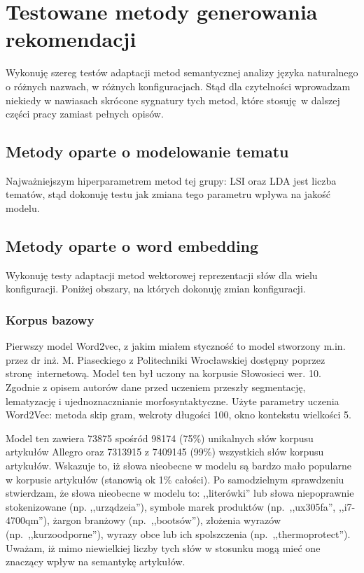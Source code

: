 \documentclass[pl]{minipw} %
\begin{document}
\section{Testowane metody generowania rekomendacji}

Wykonuję szereg testów adaptacji metod semantycznej analizy języka naturalnego o różnych nazwach, w różnych konfiguracjach. Stąd dla czytelności wprowadzam niekiedy w nawiasach skrócone sygnatury tych metod, które stosuję w dalszej części pracy zamiast pełnych opisów.

\subsection{Metody oparte o modelowanie tematu}

Najważniejszym hiperparametrem metod tej grupy: LSI oraz LDA jest liczba tematów, stąd dokonuję testu jak zmiana tego parametru wpływa na jakość modelu.

\subsection{Metody oparte o word embedding}
Wykonuję testy adaptacji metod wektorowej reprezentacji słów dla wielu konfiguracji. Poniżej obszary, na których dokonuję zmian konfiguracji.

\subsubsection{Korpus bazowy}

Pierwszy model Word2vec, z jakim miałem styczność to model\cite{pias} stworzony m.in. przez dr inż. M. Piaseckiego z Politechniki Wrocławskiej dostępny poprzez stronę internetową. Model ten był uczony na korpusie Słowosieci wer. 10\cite{wordnet}. Zgodnie z opisem autorów dane przed uczeniem  przeszły segmentację, lematyzację i ujednoznacznianie morfosyntaktyczne. Użyte parametry uczenia Word2Vec: metoda skip gram, wekroty długości 100, okno kontekstu wielkości 5.

Model ten zawiera 73875 spośród 98174 (75\%) unikalnych słów korpusu artykułów Allegro oraz 7313915 z 7409145 (99\%) wszystkich słów korpusu artykułów. Wskazuje to, iż słowa nieobecne w modelu są bardzo mało popularne w korpusie artykułów (stanowią ok 1\% całości). Po samodzielnym sprawdzeniu stwierdzam, że słowa nieobecne w modelu to: ,,literówki'' lub słowa niepoprawnie stokenizowane (np. ,,urządzeia''), symbole marek produktów (np.~,,ux305fa'', ,,i7-4700qm''), żargon branżowy (np.~,,bootsów''), złożenia wyrazów (np.~,,kurzoodporne''), wyrazy obce lub ich spolszczenia (np.~,,thermoprotect''). Uważam, iż mimo niewielkiej liczby tych słów w stosunku mogą mieć one znaczący wpływ na semantykę artykułów.
\end{document}
